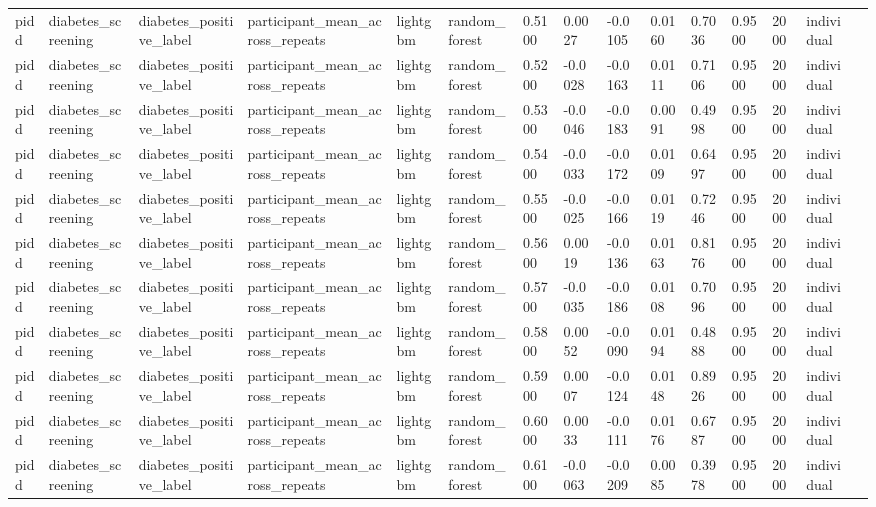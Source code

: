 \begin{tabular}{lllllllllllllll}
pidd & diabetes\_screening & diabetes\_positive\_label & participant\_mean\_across\_repeats & lightgbm & random\_forest & 0.5100 & 0.0027 & -0.0105 & 0.0160 & 0.7036 & 0.9500 & 2000 & individual &  \\
pidd & diabetes\_screening & diabetes\_positive\_label & participant\_mean\_across\_repeats & lightgbm & random\_forest & 0.5200 & -0.0028 & -0.0163 & 0.0111 & 0.7106 & 0.9500 & 2000 & individual &  \\
pidd & diabetes\_screening & diabetes\_positive\_label & participant\_mean\_across\_repeats & lightgbm & random\_forest & 0.5300 & -0.0046 & -0.0183 & 0.0091 & 0.4998 & 0.9500 & 2000 & individual &  \\
pidd & diabetes\_screening & diabetes\_positive\_label & participant\_mean\_across\_repeats & lightgbm & random\_forest & 0.5400 & -0.0033 & -0.0172 & 0.0109 & 0.6497 & 0.9500 & 2000 & individual &  \\
pidd & diabetes\_screening & diabetes\_positive\_label & participant\_mean\_across\_repeats & lightgbm & random\_forest & 0.5500 & -0.0025 & -0.0166 & 0.0119 & 0.7246 & 0.9500 & 2000 & individual &  \\
pidd & diabetes\_screening & diabetes\_positive\_label & participant\_mean\_across\_repeats & lightgbm & random\_forest & 0.5600 & 0.0019 & -0.0136 & 0.0163 & 0.8176 & 0.9500 & 2000 & individual &  \\
pidd & diabetes\_screening & diabetes\_positive\_label & participant\_mean\_across\_repeats & lightgbm & random\_forest & 0.5700 & -0.0035 & -0.0186 & 0.0108 & 0.7096 & 0.9500 & 2000 & individual &  \\
pidd & diabetes\_screening & diabetes\_positive\_label & participant\_mean\_across\_repeats & lightgbm & random\_forest & 0.5800 & 0.0052 & -0.0090 & 0.0194 & 0.4888 & 0.9500 & 2000 & individual &  \\
pidd & diabetes\_screening & diabetes\_positive\_label & participant\_mean\_across\_repeats & lightgbm & random\_forest & 0.5900 & 0.0007 & -0.0124 & 0.0148 & 0.8926 & 0.9500 & 2000 & individual &  \\
pidd & diabetes\_screening & diabetes\_positive\_label & participant\_mean\_across\_repeats & lightgbm & random\_forest & 0.6000 & 0.0033 & -0.0111 & 0.0176 & 0.6787 & 0.9500 & 2000 & individual &  \\
pidd & diabetes\_screening & diabetes\_positive\_label & participant\_mean\_across\_repeats & lightgbm & random\_forest & 0.6100 & -0.0063 & -0.0209 & 0.0085 & 0.3978 & 0.9500 & 2000 & individual &  \\

\end{tabular}
